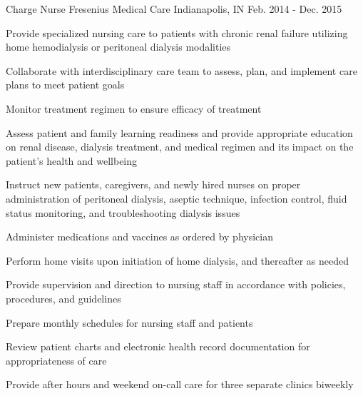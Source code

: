 \begin{cventries}
  \cventry
    {Charge Nurse} %
    {Fresenius Medical Care} %
    {Indianapolis, IN} %
    {Feb. 2014 - Dec. 2015} %
    {
      \begin{cvitems} %
        \item {Provide specialized nursing care to patients with chronic renal failure utilizing home hemodialysis or peritoneal dialysis modalities}
        \item {Collaborate with interdisciplinary care team to assess, plan, and implement care plans to meet patient goals}
        \item {Monitor treatment regimen to ensure efficacy of treatment}
        \item {Assess patient and family learning readiness and provide appropriate education on renal disease, dialysis treatment, and medical regimen and its impact on the patient's health and wellbeing}
        \item {Instruct new patients, caregivers, and newly hired nurses on proper administration of peritoneal dialysis, aseptic technique, infection control, fluid status monitoring, and troubleshooting dialysis issues}
        \item {Administer medications and vaccines as ordered by physician}
        \item {Perform home visits upon initiation of home dialysis, and thereafter as needed}
        \item {Provide supervision and direction to nursing staff in accordance with policies, procedures, and guidelines}
        \item {Prepare monthly schedules for nursing staff and patients}
        \item {Review patient charts and electronic health record documentation for appropriateness of care}
        \item {Provide after hours and weekend on-call care for three separate clinics biweekly}
      \end{cvitems}
    }


\end{cventries}
